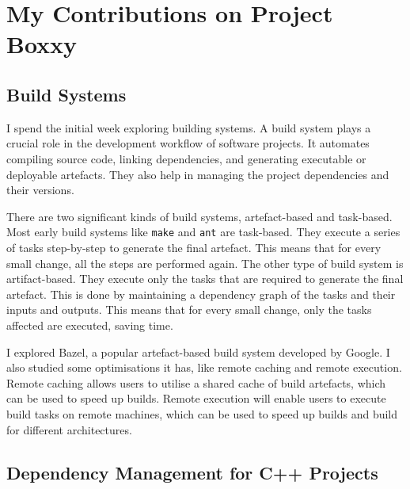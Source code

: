 
\chapter{My Contributions on Project Boxxy} %

\label{Chapter5} %


\section{Build Systems}

I spend the initial week exploring building systems. A build system plays a crucial role in the development workflow of software projects.
It automates compiling source code, linking dependencies, and generating executable or deployable artefacts.
They also help in managing the project dependencies and their versions.

There are two significant kinds of build systems, artefact-based and task-based.
Most early build systems like \texttt{make} and \texttt{ant} are task-based. They execute a series of tasks step-by-step to generate the final artefact. This means that for every small change, all the steps are performed again.
The other type of build system is artifact-based. They execute only the tasks that are required to generate the final artefact. This is done by maintaining a dependency graph of the tasks and their inputs and outputs.
This means that for every small change, only the tasks affected are executed, saving time.

I explored Bazel, a popular artefact-based build system developed by Google. I also studied some optimisations it has, like remote caching and remote execution. Remote caching allows users to utilise a shared cache of build artefacts, which can be used to speed up builds. Remote execution will enable users to execute build tasks on remote machines, which can be used to speed up builds and build for different architectures.

\section{Dependency Management for C++ Projects}

